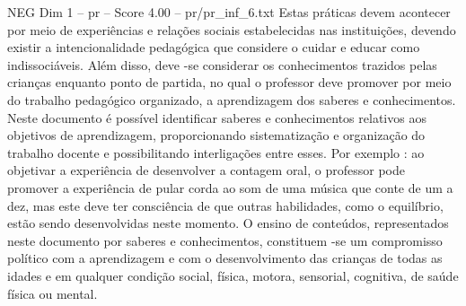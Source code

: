 \begin{textsample}{NEG Dim 1 – pr – Score 4.00 – pr/pr\_inf\_6.txt}
Estas práticas devem acontecer por meio de experiências e relações sociais estabelecidas nas instituições, devendo existir a intencionalidade pedagógica que considere o cuidar e educar como indissociáveis.
Além disso, deve -se considerar os conhecimentos trazidos pelas crianças enquanto ponto de partida, no qual o professor deve promover por meio do trabalho pedagógico organizado, a aprendizagem dos saberes e conhecimentos.
Neste documento é possível identificar saberes e conhecimentos relativos aos objetivos de aprendizagem, proporcionando sistematização e organização do trabalho docente e possibilitando interligações entre esses.
Por exemplo : ao objetivar a experiência de desenvolver a contagem oral, o professor pode promover a experiência de pular corda ao som de uma música que conte de um a dez, mas este deve ter consciência de que outras habilidades, como o equilíbrio, estão sendo desenvolvidas neste momento.
O ensino de conteúdos, representados neste documento por saberes e conhecimentos, constituem -se um compromisso político com a aprendizagem e com o desenvolvimento das crianças de todas as idades e em qualquer condição social, física, motora, sensorial, cognitiva, de saúde física ou mental.

\end{textsample}
